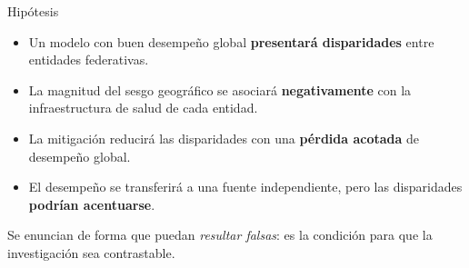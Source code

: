 \documentclass[aspectratio=169,11pt]{beamer}
\newcommand{\resalta}[1]{{\color{vino}\bfseries #1}}
\begin{document}
\begin{frame}{Hipótesis}
  \vspace{0.6em}
  \begin{itemize}\setlength\itemsep{0.5em}
    \item[\textcolor{naranja}{\bfseries H1}] Un modelo con buen desempeño global
          \resalta{presentará disparidades} entre entidades federativas.
    \item[\textcolor{naranja}{\bfseries H2}] La magnitud del sesgo geográfico se
          asociará \resalta{negativamente} con la infraestructura de salud de
          cada entidad.
    \item[\textcolor{naranja}{\bfseries H3}] La mitigación reducirá las
          disparidades con una \resalta{pérdida acotada} de desempeño global.
    \item[\textcolor{naranja}{\bfseries H4}] El desempeño se transferirá a una
          fuente independiente, pero las disparidades \resalta{podrían
          acentuarse}.
  \end{itemize}

  \vspace{0.9em}
  {\footnotesize\color{humo} Se enuncian de forma que puedan \textit{resultar
  falsas}: es la condición para que la investigación sea contrastable.}
\end{frame}
\end{document}
